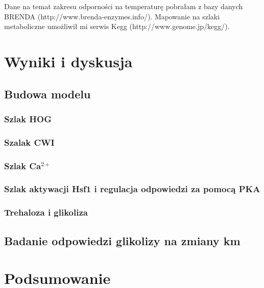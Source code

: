 \documentclass{pracamgr}
\begin{document}
Dane na temat zakresu odporności na temperaturę pobrałam z bazy danych BRENDA (http://www.brenda-enzymes.info/). Mapowanie na szlaki
metaboliczne umożliwił mi serwis Kegg (http://www.genome.jp/kegg/).


\chapter{Wyniki i dyskusja}
\section{Budowa modelu}
\subsection{Szlak HOG}
\subsection{Szalak CWI}
\subsection{Szlak Ca$^{2+}$}
\subsection{Szlak aktywacji Hsf1 i regulacja odpowiedzi za pomocą PKA}
\subsection{Trehaloza i glikoliza}

\section{Badanie odpowiedzi glikolizy na zmiany km}



\chapter{Podsumowanie}





\end{document}
